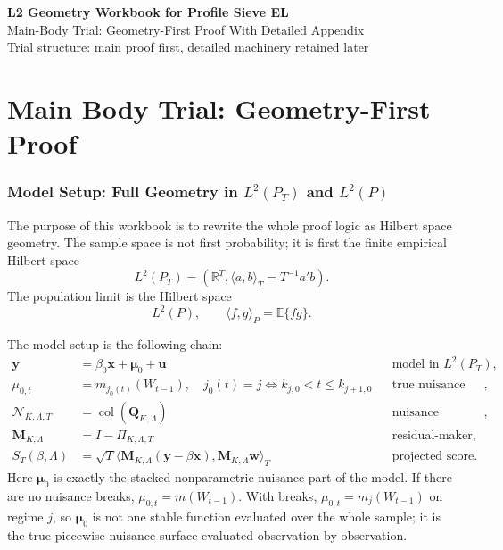 \documentclass[12pt]{article}
\numberwithin{equation}{section}
\theoremstyle{definition}
\newcommand{\E}{\mathbb E}
\newcommand{\R}{\mathbb R}
\newcommand{\N}{\mathcal N}
\newcommand{\LtwoT}{L^2(P_T)}
\newcommand{\LtwoP}{L^2(P)}
\newcommand{\innerT}[2]{\langle #1,#2\rangle_T}
\newcommand{\innerP}[2]{\langle #1,#2\rangle_P}
\begin{document}
\begin{center}
{\Large\bf L2 Geometry Workbook for Profile Sieve EL}\\[6pt]
{\large Main-Body Trial: Geometry-First Proof With Detailed Appendix}\\[6pt]
{\normalsize Trial structure: main proof first, detailed machinery retained later}\\[12pt]
\end{center}

\tableofcontents
\newpage

\part{Main Body Trial: Geometry-First Proof}


\section{Model Setup: Full Geometry in \texorpdfstring{\(L^2(P_T)\)}{L2PT} and \texorpdfstring{\(L^2(P)\)}{L2P}}

The purpose of this workbook is to rewrite the whole proof logic as Hilbert
space geometry. The sample space is not first probability; it is first the
finite empirical Hilbert space
\[
    \LtwoT=(\R^T,\innerT{a}{b}=T^{-1}a'b).
\]
The population limit is the Hilbert space
\[
    \LtwoP,\qquad \innerP{f}{g}=\E\{fg\}.
\]

The model setup is the following chain:
\[
\begin{aligned}
\bm y&=\beta_0\bm x+\bm\mu_0+\bm u
&&\text{model in }\LtwoT,\\
\mu_{0,t}&=m_{j_0(t)}(W_{t-1}),\quad
j_0(t)=j\iff k_{j,0}<t\le k_{j+1,0}
&&\text{true nuisance vector},\\
\N_{K,\Lambda,T}&=\operatorname{col}(\bm Q_{K,\Lambda})
&&\text{nuisance subspace},\\
\bm M_{K,\Lambda}&=I-\Pi_{K,\Lambda,T}
&&\text{residual-maker},\\
S_T(\beta,\Lambda)&=\sqrt T\innerT{\bm M_{K,\Lambda}(\bm y-\beta\bm x)}
{\bm M_{K,\Lambda}\bm w}
&&\text{projected score}.
\end{aligned}
\]
Here \(\bm\mu_0\) is exactly the stacked nonparametric nuisance part of the
model. If there are no nuisance breaks, \(\mu_{0,t}=m(W_{t-1})\). With breaks,
\(\mu_{0,t}=m_j(W_{t-1})\) on regime \(j\), so \(\bm\mu_0\) is not one stable
function evaluated over the whole sample; it is the true piecewise nuisance
surface evaluated observation by observation.
\end{document}

